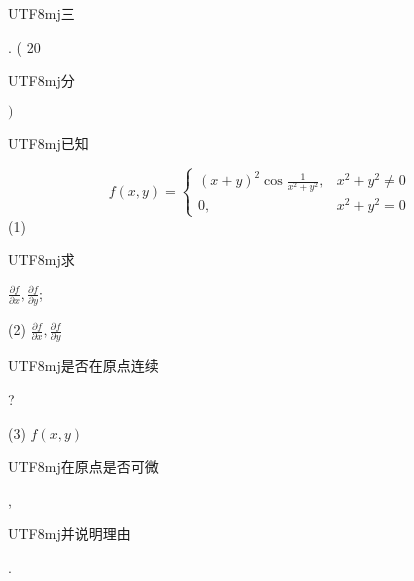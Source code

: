 \documentclass[10pt]{article}
\begin{document}
\begin{CJK}{UTF8}{mj}三\end{CJK}. ( 20 \begin{CJK}{UTF8}{mj}分\end{CJK} $)$ \begin{CJK}{UTF8}{mj}已知\end{CJK}
$$
f(x, y)= \begin{cases}(x+y)^{2} \cos \frac{1}{x^{2}+y^{2}}, & x^{2}+y^{2} \neq 0 \\ 0, & x^{2}+y^{2}=0\end{cases}
$$
(1) \begin{CJK}{UTF8}{mj}求\end{CJK} $\frac{\partial f}{\partial x}, \frac{\partial f}{\partial y}$;

(2) $\frac{\partial f}{\partial x}, \frac{\partial f}{\partial y}$ \begin{CJK}{UTF8}{mj}是否在原点连续\end{CJK}?

(3) $f(x, y)$ \begin{CJK}{UTF8}{mj}在原点是否可微\end{CJK}, \begin{CJK}{UTF8}{mj}并说明理由\end{CJK}.
\end{document}
